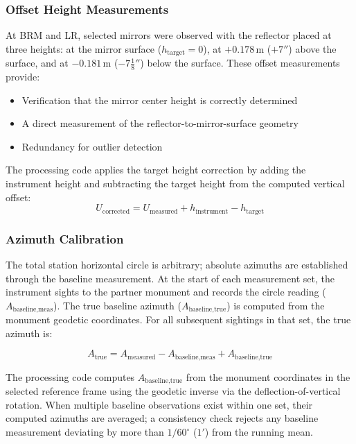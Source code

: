 \documentclass[11pt,letterpaper]{article}
\newcommand{\degree}{^\circ}
\begin{document}
\subsubsection{Offset Height Measurements}

At BRM and LR, selected mirrors were observed with the reflector placed at three heights: at the mirror surface ($h_{\text{target}} = 0$), at $+0.178$\,m ($+7''$) above the surface, and at $-0.181$\,m ($-7\frac{1}{8}''$) below the surface. These offset measurements provide:

\begin{itemize}[nosep]
    \item Verification that the mirror center height is correctly determined
    \item A direct measurement of the reflector-to-mirror-surface geometry
    \item Redundancy for outlier detection
\end{itemize}

\noindent The processing code applies the target height correction by adding the instrument height and subtracting the target height from the computed vertical offset:
\begin{equation}
U_{\text{corrected}} = U_{\text{measured}} + h_{\text{instrument}} - h_{\text{target}}
\end{equation}

\subsubsection{Azimuth Calibration}

The total station horizontal circle is arbitrary; absolute azimuths are established through the baseline measurement. At the start of each measurement set, the instrument sights to the partner monument and records the circle reading ($A_{\text{baseline,meas}}$). The true baseline azimuth ($A_{\text{baseline,true}}$) is computed from the monument geodetic coordinates. For all subsequent sightings in that set, the true azimuth is:

\begin{equation}
A_{\text{true}} = A_{\text{measured}} - A_{\text{baseline,meas}} + A_{\text{baseline,true}}
\label{eq:azimuth_cal}
\end{equation}

\noindent The processing code computes $A_{\text{baseline,true}}$ from the monument coordinates in the selected reference frame using the geodetic inverse via the deflection-of-vertical rotation. When multiple baseline observations exist within one set, their computed azimuths are averaged; a consistency check rejects any baseline measurement deviating by more than $1/60\degree$ ($1'$) from the running mean.
\end{document}
